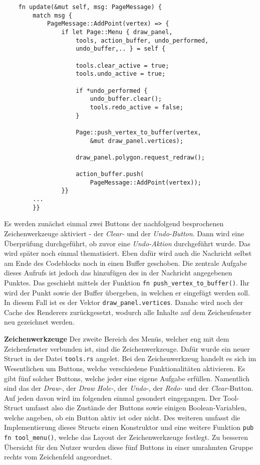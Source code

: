 \begin{lstlisting}
    fn update(&mut self, msg: PageMessage) {
        match msg {
            PageMessage::AddPoint(vertex) => {
                if let Page::Menu { draw_panel, 
                    tools, action_buffer, undo_performed, 
                    undo_buffer,.. } = self {

                    tools.clear_active = true;
                    tools.undo_active = true;
                    
                    if *undo_performed {
                        undo_buffer.clear();
                        tools.redo_active = false;
                    }

                    Page::push_vertex_to_buffer(vertex, 
                        &mut draw_panel.vertices);            
                    
                    draw_panel.polygon.request_redraw();

                    action_buffer.push(
                        PageMessage::AddPoint(vertex));     
                }}
        ...
        }}
\end{lstlisting}
Es werden zunächst einmal zwei Buttons der nachfolgend besprochenen Zeichenwerkzeuge aktiviert - der \emph{Clear-} und der \emph{Undo-Button}. Dann wird eine Überprüfung durchgeführt, ob zuvor eine \emph{Undo-Aktion} 
durchgeführt wurde. Das wird später noch einmal thematisiert. Eben dafür wird auch die Nachricht selbst am Ende des Codeblocks noch in einen Buffer geschoben.
Die zentrale Aufgabe dieses Aufrufs ist jedoch das hinzufügen des in der Nachricht angegebenen Punktes. Das geschieht mittels der Funktion \lstinline{fn push_vertex_to_buffer()}. Ihr wird 
der Punkt sowie der Buffer übergeben, in welchen er eingefügt werden soll. In diesem Fall ist es der Vektor \lstinline{draw_panel.vertices}. Danahc wird noch der Cache des Renderers zurückgesetzt, wodurch alle Inhalte auf dem 
Zeichenfenster neu gezeichnet werden.\linebreak

\textbf{Zeichenwerkzeuge}\linebreak
Der zweite Bereich des Menüs, welcher eng mit dem Zeichenfenster verbunden ist, sind die Zeichenwerkzeuge. Dafür wurde ein neuer Struct in der Datei \lstinline{tools.rs} angelet.  Bei den Zeichenwerkzeug handelt es sich im Wesentlichen um Buttons, welche verschiedene Funktionalitäten aktivieren.
Es gibt fünf solcher Buttons, welche jeder eine eigene Aufgabe erfüllen. Namentlich sind das der \emph{Draw-}, der \emph{Draw Hole-}, der \emph{Undo-}, der \emph{Redo-} und der \emph{Clear-}Button. Auf jeden davon wird im folgenden einmal gesondert eingegangen.
Der Tool-Struct umfasst also die Zustände der Buttons sowie einigen Boolean-Variablen, welche angeben, ob ein Button aktiv ist oder nicht. Des weiteren umfasst die Implementierung dieses Structs einen Konstruktor und eine weitere Funktion \lstinline{pub fn tool_menu()}, welche das Layout der Zeichenwerkzeuge festlegt.
Zu besseren Übersicht für den Nutzer wurden diese fünf Buttons in einer umrahmten Gruppe rechts vom Zeichenfeld angeordnet.

